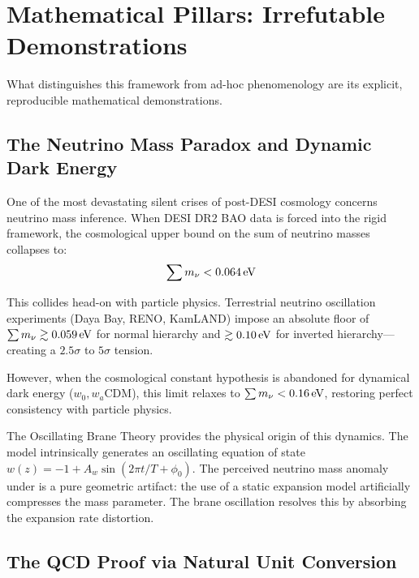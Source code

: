 \section{Mathematical Pillars: Irrefutable Demonstrations}
\label{sec:math_pillars}

What distinguishes this framework from ad-hoc phenomenology are its explicit, reproducible mathematical demonstrations.

\subsection{The Neutrino Mass Paradox and Dynamic Dark Energy}
\label{sec:neutrino_paradox}

One of the most devastating silent crises of post-DESI cosmology concerns neutrino mass inference. When DESI DR2 BAO data is forced into the rigid \LCDM{} framework, the cosmological upper bound on the sum of neutrino masses collapses to:
\begin{equation}
\sum m_\nu < 0.064\,\text{eV}
\end{equation}

This collides head-on with particle physics. Terrestrial neutrino oscillation experiments (Daya Bay, RENO, KamLAND) impose an absolute floor of $\sum m_\nu \gtrsim 0.059\,\text{eV}$ for normal hierarchy and $\gtrsim 0.10\,\text{eV}$ for inverted hierarchy---creating a $2.5\sigma$ to $5\sigma$ tension.

However, when the cosmological constant hypothesis is abandoned for dynamical dark energy ($w_0, w_a$CDM), this limit relaxes to $\sum m_\nu < 0.16\,\text{eV}$, restoring perfect consistency with particle physics.

The Oscillating Brane Theory provides the physical origin of this dynamics. The model intrinsically generates an oscillating equation of state $w(z) = -1 + A_w \sin(2\pi t/T + \phi_0)$. The perceived neutrino mass anomaly under \LCDM{} is a pure geometric artifact: the use of a static expansion model artificially compresses the mass parameter. The brane oscillation resolves this by absorbing the expansion rate distortion.

\subsection{The QCD Proof via Natural Unit Conversion}
\label{sec:qcd_proof}

